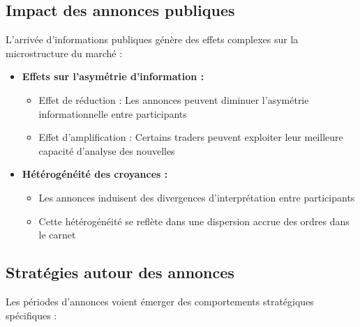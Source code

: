 \documentclass[12pt,a4paper]{article}
\theoremstyle{definition}
\theoremstyle{remark}
\begin{document}
    \subsection{Impact des annonces publiques}

    L'arrivée d'informations publiques génère des effets complexes sur la microstructure du marché :

    \begin{itemize}
        \item \textbf{Effets sur l'asymétrie d'information :}
        \begin{itemize}
            \item Effet de réduction : Les annonces peuvent diminuer l'asymétrie informationnelle entre participants
            \item Effet d'amplification : Certains traders peuvent exploiter leur meilleure capacité d'analyse des nouvelles
        \end{itemize}
        
        \item \textbf{Hétérogénéité des croyances :}
        \begin{itemize}
            \item Les annonces induisent des divergences d'interprétation entre participants
            \item Cette hétérogénéité se reflète dans une dispersion accrue des ordres dans le carnet
        \end{itemize}
    \end{itemize}

    \subsection{Stratégies autour des annonces}

    Les périodes d'annonces voient émerger des comportements stratégiques spécifiques :
\end{document}
